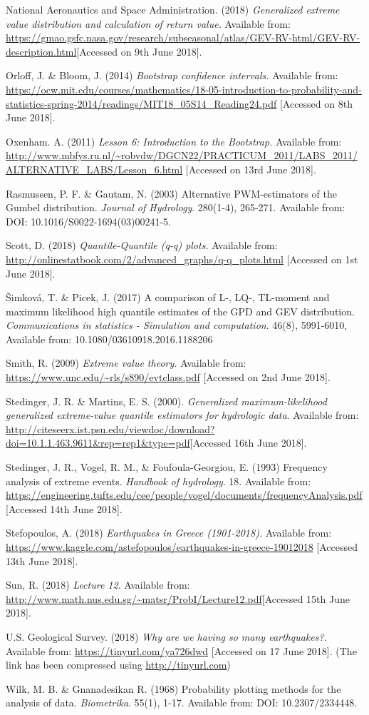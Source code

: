 \documentclass{article}
\begin{document}
National Aeronautics and Space Administration. (2018) \textit{Generalized extreme value distribution and calculation of return value.} Available from: \url{https://gmao.gsfc.nasa.gov/research/subseasonal/atlas/GEV-RV-html/GEV-RV-description.html}[Accessed on 9th June 2018].

Orloff, J. \& Bloom, J. (2014) \textit{Bootstrap confidence intervals.} 
Available from: \url{https://ocw.mit.edu/courses/mathematics/18-05-introduction-to-probability-and-statistics-spring-2014/readings/MIT18_05S14_Reading24.pdf} [Accessed on 8th June 2018].

Oxenham. A. (2011) \textit{Lesson 6: Introduction to the Bootstrap.} Available from:
\url{http://www.mbfys.ru.nl/~robvdw/DGCN22/PRACTICUM_2011/LABS_2011/ALTERNATIVE_LABS/Lesson_6.html} [Accessed on 13rd June 2018].

Rasmussen, P. F. \& Gautam, N. (2003) Alternative PWM-estimators of the Gumbel distribution. \textit{Journal of Hydrology}. 280(1-4), 265-271. Available from: DOI: 10.1016/S0022-1694(03)00241-5.

Scott, D. (2018) \textit{Quantile-Quantile (q-q) plots.} Available from: \url{http://onlinestatbook.com/2/advanced_graphs/q-q_plots.html} [Accessed on 1st June 2018].

Šimková, T. \& Picek, J. (2017) A comparison of L-, LQ-, TL-moment and
maximum likelihood high quantile estimates of the GPD and GEV distribution. \textit{Communications in statistics - Simulation and computation}. 46(8), 5991-6010, Available from: 10.1080/03610918.2016.1188206

Smith, R. (2009) \textit{Extreme value theory.} Available from: \url{https://www.unc.edu/~rls/s890/evtclass.pdf} [Accessed on 2nd June 2018].

Stedinger, J. R. \& Martins, E. S. (2000). \textit{Generalized maximum-likelihood generalized extreme-value
quantile estimators for hydrologic data}. Available from: \url{http://citeseerx.ist.psu.edu/viewdoc/download?doi=10.1.1.463.9611&rep=rep1&type=pdf}[Accessed 16th June 2018].

Stedinger, J. R., Vogel, R. M., \& Foufoula-Georgiou, E. (1993) Frequency analysis of extreme events. \textit{Handbook of hydrology}. 18. Available from: \url{https://engineering.tufts.edu/cee/people/vogel/documents/frequencyAnalysis.pdf} [Accessed 14th June 2018].

Stefopoulos, A. (2018) \textit{Earthquakes in Greece (1901-2018).} Available from: \url{https://www.kaggle.com/astefopoulos/earthquakes-in-greece-19012018} [Accessed 13th June 2018].

Sun, R. (2018) \textit{Lecture 12}. Available from: \url{http://www.math.nus.edu.sg/~matsr/ProbI/Lecture12.pdf}[Accessed 15th June 2018].

U.S. Geological Survey. (2018) \textit{Why are we having so many earthquakes?.} Available from: \url{https://tinyurl.com/ya726dwd} [Accessed on 17 June 2018]. (The link has been compressed using \url{http://tinyurl.com})

Wilk, M. B. \& Gnanadesikan R. (1968) Probability plotting methods for the analysis of data. \textit{Biometrika}. 55(1), 1-17. Available from: DOI: 10.2307/2334448.
\end{document}
